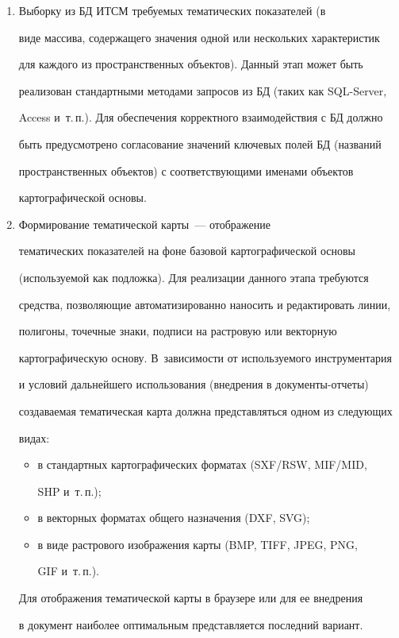      \begin{enumerate}[1.]


     \item Выборку из БД ИТСМ требуемых тематических показателей (в 


виде массива, содержащего значения одной или нескольких характеристик 


для каждого из пространственных объектов). Данный этап может быть 


реализован стандартными методами запросов из БД (таких как SQL-Server, 


Access и~т.\,п.). Для обеспечения корректного взаимодействия с БД должно 


быть предусмот\-ре\-но согласование значений ключевых полей БД (названий 


пространственных объектов) с соответствующими именами объектов 


картографической основы.


     \item Формирование тематической карты~--- отображение 


тематических показателей на фоне базовой картографической основы 


(используемой как подложка). Для реализации данного этапа требуются 


средства, позволяющие автоматизированно наносить и редактировать линии, 


полигоны, точечные знаки, подписи на растровую или векторную 


картографическую основу. В~за\-ви\-си\-мости от используемого инструментария 


и условий дальнейшего использования (внедрения в документы-отчеты) 


создаваемая тематическая карта должна представляться одном из следующих 


видах:


     \begin{itemize}


     \item в стандартных картографических форматах (SXF/RSW, MIF/MID, 


SHP  и~т.\,п.);


     \item в векторных форматах общего назначения (DXF, SVG);


     \item в виде растрового изображения карты (BMP, TIFF, JPEG, PNG, 


GIF и~т.\,п.).


     \end{itemize}


     


     Для отображения тематической карты в браузере или для ее внедрения 


в документ наиболее оптимальным представляется последний вариант.


     \end{enumerate}





